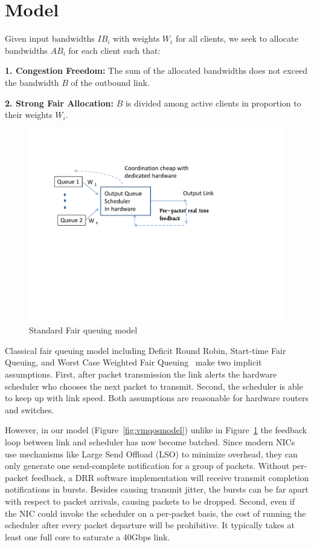 \section{Model}
\label{sec:model}

Given input bandwidths $IB_i$ with weights $W_i$ for all clients, we seek to allocate bandwidths $AB_i$ for each
client such that:  

{\bf 1. Congestion Freedom:}  The sum of the allocated bandwidths does not
exceed the bandwidth $B$ of the outbound link. 

{\bf 2. Strong Fair Allocation: } $B$ is divided among active clients in proportion
to their weights $W_i$.

\begin{figure}[t]
\center
\includegraphics[width=\columnwidth,trim=6mm 90mm 20mm 10mm]{figures/standardqosmodel}
\caption{Standard Fair queuing model}
\label{fig:qosmodel}
\vspace{-2mm}
\end{figure}

Classical fair queuing model including Deficit Round Robin, Start-time Fair Queuing, and Worst Case Weighted Fair
Queuing~\cite{drr, stfq,w2fq, qfq} make two implicit
assumptions. First, after packet transmission the link
alerts the hardware scheduler who chooses the next packet to transmit. Second,
the scheduler is able to keep up with link speed.
Both assumptions are reasonable for hardware routers and switches.

However, in our model  (Figure~\ref{fig:vmqosmodel}) unlike
in Figure~\ref{fig:qosmodel} the feedback
loop between link and scheduler has now become batched.
Since modern NICs use mechanisms like Large Send Offload (LSO) to minimize overhead,
they can only generate one send-complete notification for a group of
packets.  Without per-packet feedback, a DRR software implementation will receive
transmit completion notifications in bursts.   Besides causing transmit jitter, 
the bursts can be far apart with respect to packet arrivals, causing packets to be
dropped. Second, even if the NIC could invoke the scheduler on a per-packet
basis, the cost of running the scheduler after every packet departure will be
prohibitive. It typically takes at least one full core to saturate a 40Gbps link.
 

